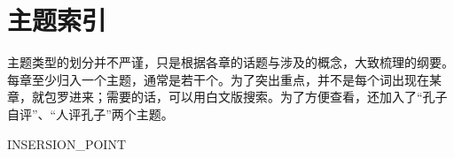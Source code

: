 \chapter*{主\quad 题\quad 索\quad 引}

主题类型的划分并不严谨，只是根据各章的话题与涉及的概念，大致梳理的纲要。每章至少归入一个主题，通常是若干个。为了突出重点，并不是每个词出现在某章，就包罗进来；需要的话，可以用白文版搜索。为了方便查看，还加入了“孔子自评”、“人评孔子”两个主题。

\bigskip

{\setlength{\parindent}{0pt}

INSERSION_POINT
}  %
